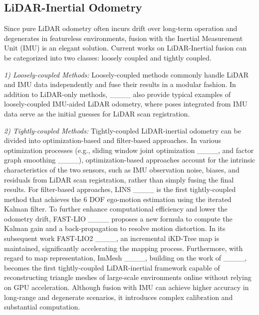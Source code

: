 \subsection{LiDAR-Inertial Odometry}
Since pure LiDAR odometry often incurs drift over long-term operation and degenerates in featureless environments, fusion with the Inertial Measurement Unit (IMU) is an elegant solution. Current works on LiDAR-Inertial fusion can be categorized into two classes: loosely coupled and tightly coupled.

\emph{1) Loosely-coupled Methods:}
Loosely-coupled methods commonly handle LiDAR and IMU data independently and fuse their results in a modular fashion. In addition to LiDAR-only methods, ____ also provide typical examples of loosely-coupled IMU-aided LiDAR odometry, where poses integrated from IMU data serve as the initial guesses for LiDAR scan registration.

\emph{2) Tightly-coupled Methods:}
Tightly-coupled LiDAR-inertial odometry can be divided into optimization-based and filter-based approaches. In various optimization processes (e.g., sliding window joint optimization ____, and factor graph smoothing ____), optimization-based approaches account for the intrinsic characteristics of the two sensors, such as IMU observation noise, biases, and residuals from LiDAR scan registration, rather than simply fusing the final results.
For filter-based approaches, LINS ____ is the first tightly-coupled method that achieves the 6 DOF ego-motion estimation using the iterated Kalman filter. To further enhance computational efficiency and lower the odometry drift, FAST-LIO ____ proposes a new formula to compute the Kalman gain and a back-propagation to resolve motion distortion. In its subsequent work FAST-LIO2 ____, an incremental iKD-Tree map is maintained, significantly accelerating the mapping process.
Furthermore, with regard to map representation, ImMesh ____, building on the work of ____, becomes the first tightly-coupled LiDAR-inertial framework capable of reconstructing triangle meshes of large-scale environments online without relying on GPU acceleration.
Although fusion with IMU can achieve higher accuracy in long-range and degenerate scenarios, it introduces complex calibration and substantial computation.

